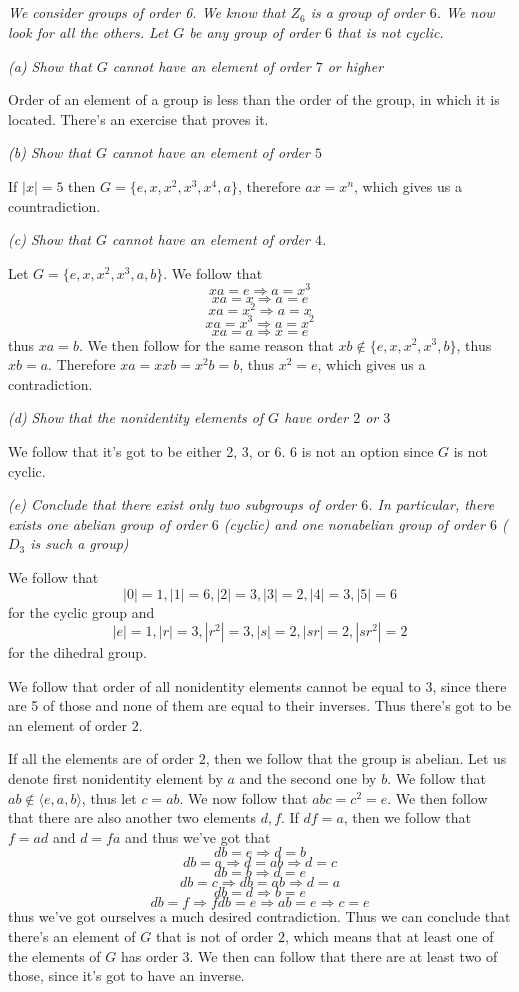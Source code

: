 \documentclass[11pt,oneside,titlepage]{book}
\DeclareMathOperator \ra {\Rightarrow}
\newcommand{\eangle}[1]{\langle #1 \rangle}
\newcommand{\set}[1]{\{ #1 \}}
\begin{document}
\subsection{}

\textit{We consider groups of order 6. We know that $Z_6$ is a group of order $6$. We now
  look for all the others. Let $G$ be any group of order $6$ that is not cyclic.}

\textit{(a) Show that $G$ cannot have an element of order $7$ or higher}

Order of an element of a group is less than the order of the group, in which it is located. There's
an exercise that proves it.

\textit{(b) Show that $G$ cannot have an element of order $5$}

If $|x| = 5$ then $G = \set{e, x, x^2, x^3, x^4, a}$, therefore $ax = x^n$, which gives us
a countradiction.

\textit{(c) Show that $G$ cannot have an element of order $4$.}

Let $G = \set{e, x, x^2, x^3, a, b}$. We follow that
$$xa = e \ra a = x^3$$
$$xa = x \ra a = e$$
$$xa = x^2 \ra a = x$$
$$xa = x^3 \ra a = x^2$$
$$xa = a \ra x = e$$
thus $xa = b$. We then follow for the same reason that $xb \notin \set{e, x, x^2, x^3, b}$,
thus $xb = a$. Therefore $xa = xxb = x^2b = b$, thus $x^2 = e$, which gives us a contradiction.

\textit{(d) Show that the nonidentity elements of $G$ have order $2$ or $3$}

We follow that it's got to be either 2, 3, or 6. 6 is not an option since $G$ is not cyclic.

\textit{(e) Conclude that there exist only two subgroups of order $6$. In particular,
  there exists one abelian group of order $6$ (cyclic) and one nonabelian group of order $6$
  ($D_3$ is such a group)}

We follow that
$$|0| = 1, |1| = 6, |2| = 3, |3| = 2, |4| = 3, |5| = 6$$
for the cyclic group and
$$|e| = 1, |r| = 3, |r^2| = 3, |s| = 2, |sr| = 2, |sr^2| = 2$$
for the dihedral group.

We follow that order of all nonidentity elements cannot be equal to $3$, since there are
5 of those and none of them are equal to their inverses. Thus there's got to be an element of
order $2$.

If all the elements are of order $2$, then we follow that the group is abelian.
Let us denote first nonidentity element by $a$ and the second one by $b$. We follow that
$ab \notin \eangle{e, a, b}$, thus let $c = ab$. We now follow that $abc = c^2 = e$. We then
follow that there are also another two elements $d, f$. If $df = a$, then we follow that
$f = ad$ and $d = fa$ and thus we've got that
$$db = e \ra d = b$$
$$db = a \ra d = ab \ra d = c$$
$$db = b \ra d = e$$
$$db = c \ra db = ab \ra d = a$$
$$db = d \ra b = e$$
$$db = f \ra fdb = e \ra ab = e \ra c = e $$
thus we've got ourselves a much desired contradiction. Thus we can conclude that there's an
element of $G$ that is not of order $2$, which means that at least one of the elements of $G$
has order $3$. We then can follow that there are at least two of those, since it's got to
have an inverse.
\end{document}

